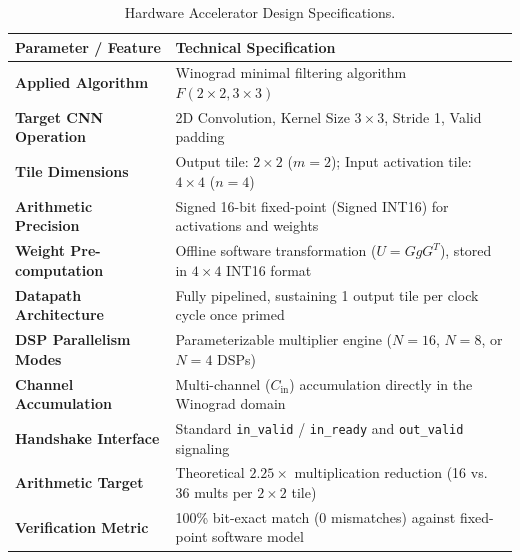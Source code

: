\documentclass[12pt,a4paper]{article}
\begin{document}
\begin{table}[htbp]
    \centering
    \caption{Hardware Accelerator Design Specifications.}
    \label{tab:specifications}
    \small
    \begin{tabularx}{\textwidth}{lX}
        \toprule
        \textbf{Parameter / Feature} & \textbf{Technical Specification} \\
        \midrule
        \textbf{Applied Algorithm}      & Winograd minimal filtering algorithm $F(2 \times 2, 3 \times 3)$ \\
        \textbf{Target CNN Operation}   & 2D Convolution, Kernel Size $3 \times 3$, Stride 1, Valid padding \\
        \textbf{Tile Dimensions}        & Output tile: $2 \times 2$ ($m=2$); Input activation tile: $4 \times 4$ ($n=4$) \\
        \textbf{Arithmetic Precision}   & Signed 16-bit fixed-point (Signed INT16) for activations and weights \\
        \textbf{Weight Pre-computation} & Offline software transformation ($U = G g G^T$), stored in $4 \times 4$ INT16 format \\
        \textbf{Datapath Architecture}  & Fully pipelined, sustaining 1 output tile per clock cycle once primed \\
        \textbf{DSP Parallelism Modes}  & Parameterizable multiplier engine ($N=16$, $N=8$, or $N=4$ DSPs) \\
        \textbf{Channel Accumulation}   & Multi-channel ($C_{\text{in}}$) accumulation directly in the Winograd domain \\
        \textbf{Handshake Interface}    & Standard \texttt{in\_valid} / \texttt{in\_ready} and \texttt{out\_valid} signaling \\
        \textbf{Arithmetic Target}      & Theoretical $2.25\times$ multiplication reduction (16 vs. 36 mults per $2 \times 2$ tile) \\
        \textbf{Verification Metric}    & 100\% bit-exact match ($0$ mismatches) against fixed-point software model \\
        \bottomrule
    \end{tabularx}
\end{table}
\end{document}
